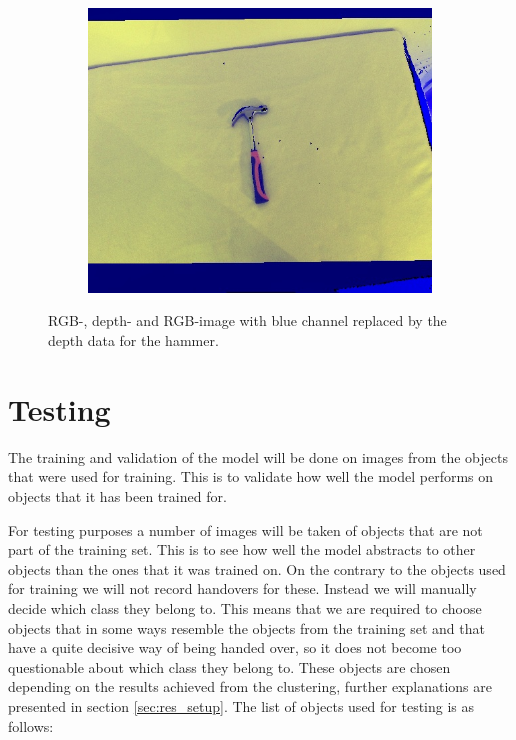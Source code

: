 \begin{figure}
\begin{subfigure}[b]{0.3\textwidth}
		\includegraphics[width=\textwidth]{img/methods/rgbd/rgbd.jpg}
	\end{subfigure}
	\caption{RGB-, depth- and RGB-image with blue channel replaced by the depth data for the hammer.}
	\label{fig:rgbd}
\end{figure}


\section{Testing}
\label{sec:testing}

The training and validation of the model will be done on images from the objects that were used for training. This is to validate how well the model performs on objects that it has been trained for.

For testing purposes a number of images will be taken of objects that are not part of the training set. This is to see how well the model abstracts to other objects than the ones that it was trained on. On the contrary to the objects used for training we will not record handovers for these. Instead we will manually decide which class they belong to. This means that we are required to choose objects that in some ways resemble the objects from the training set and that have a quite decisive way of being handed over, so it does not become too questionable about which class they belong to. These objects are chosen depending on the results achieved from the clustering, further explanations are presented in section \ref{sec:res_setup}. The list of objects used for testing is as follows:

